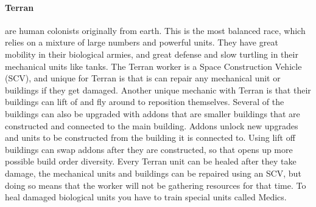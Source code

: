 \paragraph{Terran} are human colonists originally from earth. This is the most balanced race, which relies on a mixture of large numbers and powerful units. They have great mobility in their biological armies, and  great defense and slow turtling in their mechanical units like tanks. 
The Terran worker is a Space Construction Vehicle (SCV), and unique for Terran is that is can repair any mechanical unit or buildings if they get damaged. Another unique mechanic with Terran is that their buildings can lift of and fly around to reposition themselves. Several of the buildings can also be upgraded with addons that are smaller buildings that are constructed and connected to the main building. Addons unlock new upgrades and units to be constructed from the building it is connected to. Using lift off buildings can swap addons after they are constructed, so that opens up more possible build order diversity. Every Terran unit can be healed after they take damage, the mechanical units and buildings can be repaired using an SCV, but doing so means that the worker will not be gathering resources for that time. To heal damaged biological units you have to train special units called Medics. 

